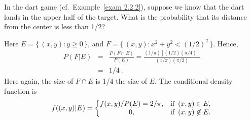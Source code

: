 \begin{example}\label{exam 4.13}
In the dart game (cf.\ Example~\ref{exam 2.2.2}),
suppose we know that the dart lands in the upper half of the target.  What is
the probability that its distance from the center is less than 1/2?

Here $E = \{\,(x,y) : y \geq 0\,\}$, and $F = \{\,(x,y) : x^2 + y^2 <
(1/2)^2\,\}$.  Hence,
\begin{eqnarray*}
P(F|E) & = & \frac {P(F \cap E)}{P(E)} = \frac {(1/\pi)[(1/2)(\pi/4)]}
{(1/\pi)(\pi/2)} \\
       & = & 1/4\ .
\end{eqnarray*}
Here again, the size of $F \cap E$ is 1/4 the size of $E$.  The conditional
density function is
$$
f((x,y)|E) =  \left \{ \begin{matrix}
        f(x,y)/P(E) = 2/\pi, &\mbox{if}\,\,\,(x,y) \in E, \cr
        0,                   &\mbox{if}\,\,\,(x,y) \not \in E.\cr\end{matrix}\right.
$$
\end{example}

